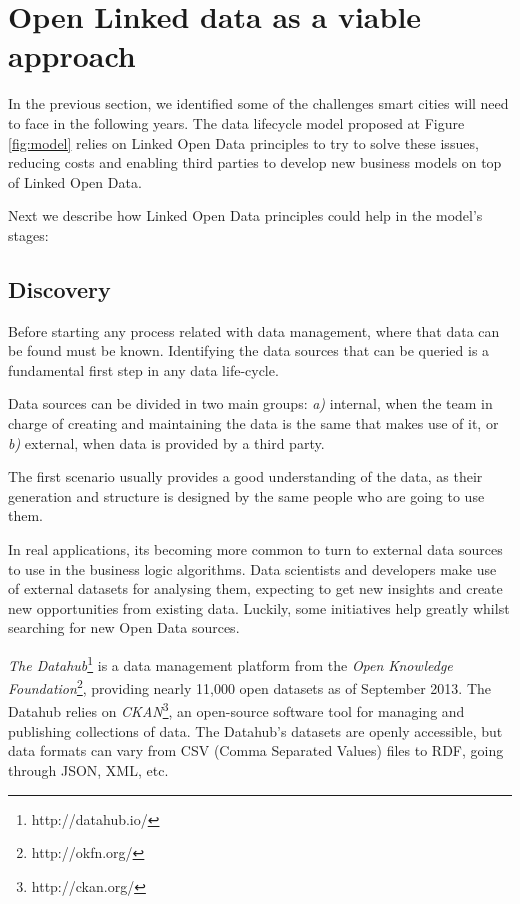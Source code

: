 \section{Open Linked data as a viable approach}

In the previous section, we identified some of the challenges smart cities will need to face in the following years. The data lifecycle model proposed at Figure \ref{fig:model} relies on Linked Open Data principles to try to solve these issues, reducing costs and enabling third parties to develop new business models on top of Linked Open Data.

Next we describe how Linked Open Data principles could help in the model's stages:

\subsection{Discovery}\label{subsec:discovery}

Before starting any process related with data management, where that data can be found must be known. Identifying the data sources that can be queried is a fundamental first step in any data life-cycle.

Data sources can be divided in two main groups: \textit{a)} internal, when the team in charge of creating and maintaining the data is the same that makes use of it, or \textit{b)} external, when data is provided by a third party.

The first scenario usually provides a good understanding of the data, as their generation and structure is designed by the same people who are going to use them.

In real applications, its becoming more common to turn to external data sources to use in the business logic algorithms. Data scientists and developers make use of external datasets for analysing them, expecting to get new insights and create new opportunities from existing data. Luckily, some initiatives help greatly whilst searching for new Open Data sources.

\textit{The Datahub}\footnote{http://datahub.io/} is a data management platform from the \textit{Open Knowledge Foundation}\footnote{http://okfn.org/}, providing nearly 11,000 open datasets as of September 2013. The Datahub relies on \textit{CKAN}\footnote{http://ckan.org/}, an open-source software tool for managing and publishing collections of data. The Datahub's datasets are openly accessible, but data formats can vary from CSV (Comma Separated Values) files to RDF, going through JSON, XML, etc.

